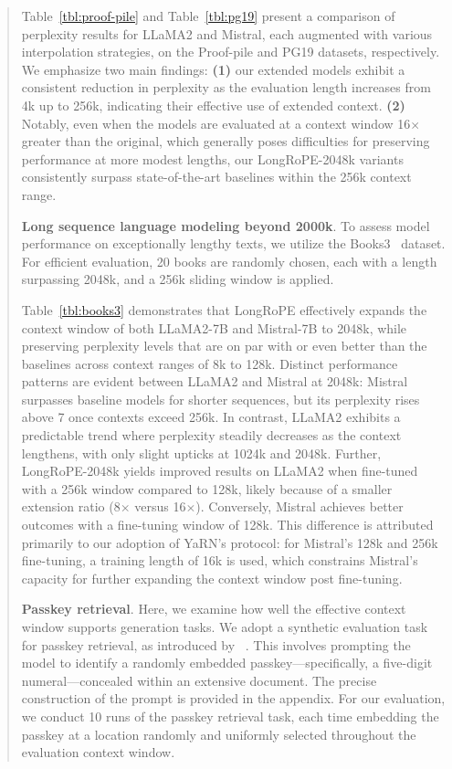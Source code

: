 \begin{abstract}
Table~\ref{tbl:proof-pile} and Table~\ref{tbl:pg19} present a comparison of perplexity results for LLaMA2 and Mistral, each augmented with various interpolation strategies, on the Proof-pile and PG19 datasets, respectively. We emphasize two main findings: \textbf{(1)} our extended models exhibit a consistent reduction in perplexity as the evaluation length increases from 4k up to 256k, indicating their effective use of extended context. \textbf{(2)} Notably, even when the models are evaluated at a context window 16$\times$ greater than the original, which generally poses difficulties for preserving performance at more modest lengths, our LongRoPE-2048k variants consistently surpass state-of-the-art baselines within the 256k context range.

\textbf{Long sequence language modeling beyond 2000k}. To assess model performance on exceptionally lengthy texts, we utilize the Books3~\cite{pile} dataset. For efficient evaluation, 20 books are randomly chosen, each with a length surpassing 2048k, and a 256k sliding window is applied.

Table~\ref{tbl:books3} demonstrates that LongRoPE effectively expands the context window of both LLaMA2-7B and Mistral-7B to 2048k, while preserving perplexity levels that are on par with or even better than the baselines across context ranges of 8k to 128k. Distinct performance patterns are evident between LLaMA2 and Mistral at 2048k: Mistral surpasses baseline models for shorter sequences, but its perplexity rises above 7 once contexts exceed 256k. In contrast, LLaMA2 exhibits a predictable trend where perplexity steadily decreases as the context lengthens, with only slight upticks at 1024k and 2048k. Further, LongRoPE-2048k yields improved results on LLaMA2 when fine-tuned with a 256k window compared to 128k, likely because of a smaller extension ratio (8$\times$ versus 16$\times$). Conversely, Mistral achieves better outcomes with a fine-tuning window of 128k. This difference is attributed primarily to our adoption of YaRN’s protocol: for Mistral’s 128k and 256k fine-tuning, a training length of 16k is used, which constrains Mistral’s capacity for further expanding the context window post fine-tuning.

\textbf{Passkey retrieval}. Here, we examine how well the effective context window supports generation tasks. We adopt a synthetic evaluation task for passkey retrieval, as introduced by ~\cite{passkey}. This involves prompting the model to identify a randomly embedded passkey—specifically, a five-digit numeral—concealed within an extensive document. The precise construction of the prompt is provided in the appendix. For our evaluation, we conduct 10 runs of the passkey retrieval task, each time embedding the passkey at a location randomly and uniformly selected throughout the evaluation context window.


\end{abstract}
